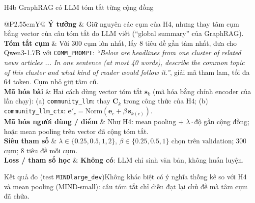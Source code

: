 \documentclass[aspectratio=169,t]{beamer}
\makeatletter
\newcommand{\code}[1]{\texttt{#1}}
\newcommand{\bangmota}[1]{{\scriptsize\renewcommand{\arraystretch}{1.1}\setlength{\tabcolsep}{4pt}%
  \begin{tabularx}{\textwidth}{@{}P{2.55cm}Y@{}}\toprule #1 \bottomrule\end{tabularx}}}
\newcommand{\rw}[2]{\textbf{#1} & #2\\ \midrule}
\newcommand{\rwl}[2]{\textbf{#1} & #2\\}
\newcommand{\ketqua}[1]{\begin{exampleblock}{Kết quả đo (test \code{MINDlarge\_dev})}\scriptsize #1\end{exampleblock}}
\makeatother
\begin{document}
\begin{frame}[shrink]{H4b \textperiodcentered{} GraphRAG có LLM tóm tắt từng cộng đồng}
\bangmota{
\rw{Ý tưởng}{Giữ nguyên các cụm của H4, nhưng thay tâm cụm bằng vector của câu tóm tắt do LLM viết (``global summary'' của GraphRAG).}
\rw{Tóm tắt cụm}{Với 300 cụm lớn nhất, lấy 8 tiêu đề gần tâm nhất, đưa cho Qwen3-1.7B với \code{COMM\_PROMPT}: \textit{``Below are headlines from one cluster of related news articles ... In one sentence (at most 40 words), describe the common topic of this cluster and what kind of reader would follow it.''}, giải mã tham lam, tối đa 64 token. Cụm nhỏ giữ tâm cũ.}
\rw{Mã hóa bài}{Hai cách dùng vector tóm tắt $\mathbf s_k$ (mã hóa bằng chính encoder của lần chạy): (a) \code{community\_llm}: thay $\mathbf C_k$ trong công thức của H4; (b) \code{community\_llm\_ctx}: $\mathbf e'_c=\mathrm{Norm}(\mathbf e_c+\beta\,\mathbf s_{k(c)})$.}
\rw{Mã hóa người dùng / điểm}{Như H4: mean pooling + $\lambda\cdot$độ gần cộng đồng; hoặc mean pooling trên vector đã cộng tóm tắt.}
\rw{Siêu tham số}{$\lambda\in\{0.25,0.5,1,2\}$, $\beta\in\{0.25,0.5,1\}$ chọn trên validation; 300 cụm; 8 tiêu đề mỗi cụm.}
\rwl{Loss / tham số học}{\textbf{Không có}: LLM chỉ sinh văn bản, không huấn luyện.}
}
\ketqua{Không khác biệt có ý nghĩa thống kê so với H4 và mean pooling (MIND-small): câu tóm tắt chỉ diễn đạt lại chủ đề mà tâm cụm đã chứa.}
\par\kern0pt
\end{frame}
\end{document}
